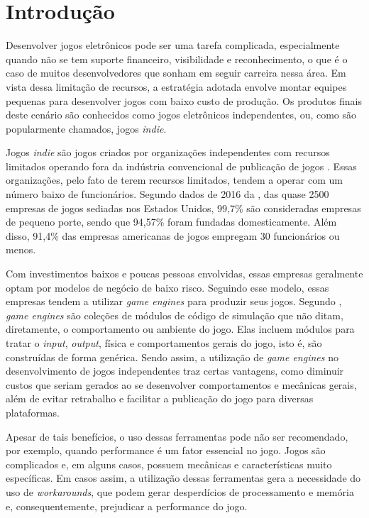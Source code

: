 \chapter*[Introdução]{Introdução}

Desenvolver jogos eletrônicos pode ser uma tarefa complicada, especialmente quando não se tem suporte financeiro, visibilidade e reconhecimento, o que é o caso de muitos desenvolvedores que sonham em seguir carreira nessa área. Em vista dessa limitação de recursos, a estratégia adotada envolve montar equipes pequenas para desenvolver jogos com baixo custo de produção. Os produtos finais deste cenário são conhecidos como jogos eletrônicos independentes, ou, como são popularmente chamados, jogos \textit{indie}.

Jogos \textit{indie} são jogos criados por organizações independentes com recursos limitados operando fora da indústria convencional de publicação de jogos \cite{end2end}. Essas organizações, pelo fato de terem recursos limitados, tendem a operar com um número baixo de funcionários. Segundo dados de 2016 da , das quase 2500 empresas de jogos sediadas nos Estados Unidos, 99,7\% são consideradas empresas de pequeno porte, sendo que 94,57\% foram fundadas domesticamente. Além disso, 91,4\% das empresas americanas de jogos empregam 30 funcionários ou menos.

Com investimentos baixos e poucas pessoas envolvidas, essas empresas geralmente optam por modelos de negócio de baixo risco. Seguindo esse modelo, essas empresas tendem a utilizar \textit{game engines} para produzir seus jogos. Segundo , \textit{game engines} são coleções de módulos de código de simulação que não ditam, diretamente, o comportamento ou ambiente do jogo. Elas incluem módulos para tratar o \textit{input}, \textit{output}, física e comportamentos gerais do jogo, isto é, são construídas de forma genérica. Sendo assim, a utilização de \textit{game engines} no desenvolvimento de jogos independentes traz certas vantagens, como diminuir custos que seriam gerados ao se desenvolver comportamentos e mecânicas gerais, além de evitar retrabalho e facilitar a publicação do jogo para diversas plataformas.

Apesar de tais benefícios, o uso dessas ferramentas pode não ser recomendado, por exemplo, quando performance é um fator essencial no jogo. Jogos são complicados e, em alguns casos, possuem mecânicas e características muito específicas. Em casos assim, a utilização dessas ferramentas gera a necessidade do uso de \textit{workarounds}, que podem gerar desperdícios de processamento e memória e, consequentemente, prejudicar a performance do jogo.

